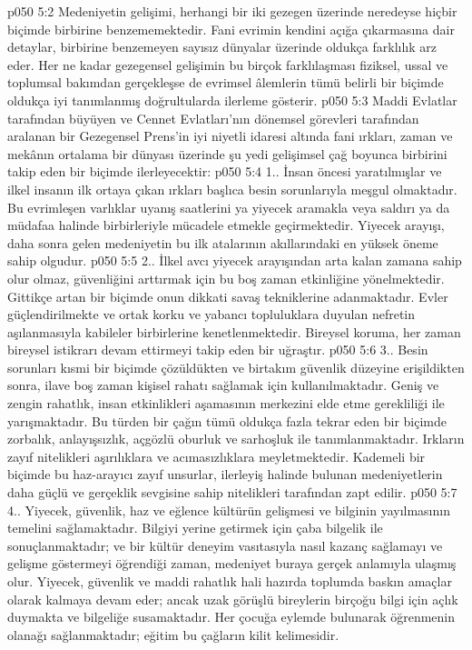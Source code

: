 \vs p050 5:2 Medeniyetin gelişimi, herhangi bir iki gezegen üzerinde neredeyse hiçbir biçimde birbirine benzememektedir. Fani evrimin kendini açığa çıkarmasına dair detaylar, birbirine benzemeyen sayısız dünyalar üzerinde oldukça farklılık arz eder. Her ne kadar gezegensel gelişimin bu birçok farklılaşması fiziksel, ussal ve toplumsal bakımdan gerçekleşse de evrimsel âlemlerin tümü belirli bir biçimde oldukça iyi tanımlanmış doğrultularda ilerleme gösterir.
\vs p050 5:3 Maddi Evlatlar tarafından büyüyen ve Cennet Evlatları’nın dönemsel görevleri tarafından aralanan bir Gezegensel Prens’in iyi niyetli idaresi altında fani ırkları, zaman ve mekânın ortalama bir dünyası üzerinde şu yedi gelişimsel çağ boyunca birbirini takip eden bir biçimde ilerleyecektir:
\vs p050 5:4 1.\bibnobreakspace {}. İnsan öncesi yaratılmışlar ve ilkel insanın ilk ortaya çıkan ırkları başlıca besin sorunlarıyla meşgul olmaktadır. Bu evrimleşen varlıklar uyanış saatlerini ya yiyecek aramakla veya saldırı ya da müdafaa halinde birbirleriyle mücadele etmekle geçirmektedir. Yiyecek arayışı, daha sonra gelen medeniyetin bu ilk atalarının akıllarındaki en yüksek öneme sahip olgudur.
\vs p050 5:5 2.. İlkel avcı yiyecek arayışından arta kalan zamana sahip olur olmaz, güvenliğini arttırmak için bu boş zaman etkinliğine yönelmektedir. Gittikçe artan bir biçimde onun dikkati savaş tekniklerine adanmaktadır. Evler güçlendirilmekte ve ortak korku ve yabancı topluluklara duyulan nefretin aşılanmasıyla kabileler birbirlerine kenetlenmektedir. Bireysel koruma, her zaman bireysel istikrarı devam ettirmeyi takip eden bir uğraştır.
\vs p050 5:6 3.\bibnobreakspace {}. Besin sorunları kısmi bir biçimde çözüldükten ve birtakım güvenlik düzeyine erişildikten sonra, ilave boş zaman kişisel rahatı sağlamak için kullanılmaktadır. Geniş ve zengin rahatlık, insan etkinlikleri aşamasının merkezini elde etme gerekliliği ile yarışmaktadır. Bu türden bir çağın tümü oldukça fazla tekrar eden bir biçimde zorbalık, anlayışsızlık, açgözlü oburluk ve sarhoşluk ile tanımlanmaktadır. Irkların zayıf nitelikleri aşırılıklara ve acımasızlıklara meyletmektedir. Kademeli bir biçimde bu haz\hyp{}arayıcı zayıf unsurlar, ilerleyiş halinde bulunan medeniyetlerin daha güçlü ve gerçeklik sevgisine sahip nitelikleri tarafından zapt edilir.
\vs p050 5:7 4.\bibnobreakspace {}. Yiyecek, güvenlik, haz ve eğlence kültürün gelişmesi ve bilginin yayılmasının temelini sağlamaktadır. Bilgiyi yerine getirmek için çaba bilgelik ile sonuçlanmaktadır; ve bir kültür deneyim vasıtasıyla nasıl kazanç sağlamayı ve gelişme göstermeyi öğrendiği zaman, medeniyet buraya gerçek anlamıyla ulaşmış olur. Yiyecek, güvenlik ve maddi rahatlık hali hazırda toplumda baskın amaçlar olarak kalmaya devam eder; ancak uzak görüşlü bireylerin birçoğu bilgi için açlık duymakta ve bilgeliğe susamaktadır. Her çocuğa eylemde bulunarak öğrenmenin olanağı sağlanmaktadır; eğitim bu çağların kilit kelimesidir.
